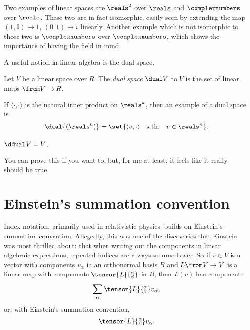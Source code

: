 Two examples of linear spaces are $\reals^2$ over $\reals$ and $\complexnumbers$ over $\reals$.
These two are in fact isomorphic, easily seen by extending the map $(1, 0) \mapsto 1$, $(0, 1) \mapsto i$ linearly.
Another example which is not isomorphic to those two is $\complexnumbers$ over $\complexnumbers$, which shows the importance of having the field in mind.

A useful notion in linear algebra is the dual space.
\begin{definition}\label{def:dual_space}
	Let $V$ be a linear space over $R$.
	The \emph{dual space} $\dual V$ to $V$ is the set of linear maps $\from V \to R$.
\end{definition}

If $\langle \cdot, \cdot \rangle$ is the natural inner product on $\reals^n$, then an example of a dual space is
\begin{align*}
	\dual{(\reals^n)} = \set{ \langle v, \cdot \rangle \quad \textrm{s.th.} \quad v \in \reals^n}.
\end{align*}

\begin{proposition}\label{prop:dual_dual_space}
	$\ddual V = V$.
\end{proposition}

You can prove this if you want to, but, for me at least, it feels like it really should be true.


\section{Einstein's summation convention}%
\label{sec:einstein_s_summation_convention}

Index notation, primarily used in relativistic physics, builds on Einstein's summation convention.
Allegedly, this was one of the discoveries that Einstein was most thrilled about: that when writing out the components in linear algebraic expressions, repeated indices are always summed over.
So if $v \in V$ is a vector with components $v_\alpha$ in an orthonormal basis $B$ and $L \from V \to V$ is a linear map with components $\tensor{L}{^\alpha_\beta}$ in $B$, then $L(v)$ has components
\begin{align*}
	\sum_\alpha \tensor{L}{^\alpha_\beta} v_\alpha,
\end{align*}
or, with Einstein's summation convention,
\begin{align*}
	\tensor{L}{^\alpha_\beta} v_\alpha.
\end{align*}

